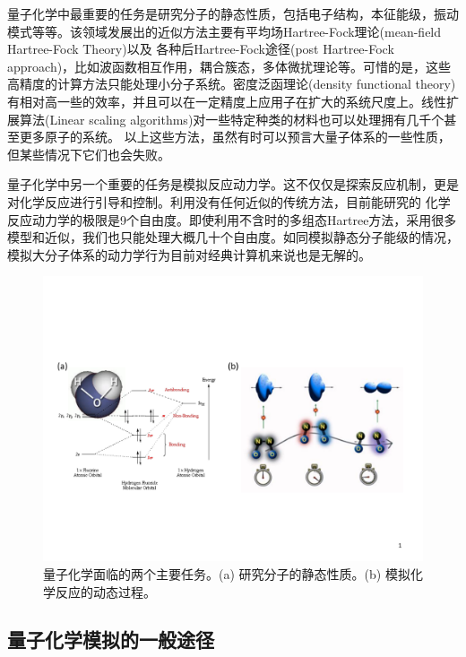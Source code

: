 量子化学中最重要的任务是研究分子的静态性质，包括电子结构，本征能级，振动模式等等\cite{qschem2}。该领域发展出的近似方法主要有平均场Hartree-Fock理论(mean-field Hartree-Fock Theory)以及
各种后Hartree-Fock途径(post Hartree-Fock approach)，比如波函数相互作用，耦合簇态，多体微扰理论等\cite{qschem3}。可惜的是，这些高精度的计算方法只能处理小分子系统。密度泛函理论(density functional theory)\cite{qschem4,qschem5,qschem6}
有相对高一些的效率，并且可以在一定精度上应用子在扩大的系统尺度上。线性扩展算法(Linear scaling algorithms)\cite{qschem7,qschem8}对一些特定种类的材料也可以处理拥有几千个甚至更多原子的系统。
以上这些方法，虽然有时可以预言大量子体系的一些性质，但某些情况下它们也会失败\cite{qschem9,qschem10,qschem11,qschem12}。

量子化学中另一个重要的任务是模拟反应动力学。这不仅仅是探索反应机制，更是对化学反应进行引导和控制\cite{qschem13,qschem14,qschem15,qschem16}。利用没有任何近似的传统方法，目前能研究的
化学反应动力学的极限是9个自由度\cite{qschem17}。即使利用不含时的多组态Hartree方法\cite{qschem18}，采用很多模型和近似，我们也只能处理大概几十个自由度。如同模拟静态分子能级的情况，
模拟大分子体系的动力学行为目前对经典计算机来说也是无解的。

\begin{figure}[htbp]
            \begin{center}
              \includegraphics[width= 0.8\columnwidth]{figures/chemscheme.pdf}
              \caption{量子化学面临的两个主要任务。(a) 研究分子的静态性质。(b) 模拟化学反应的动态过程。 }\label{chemscheme}
            \end{center}
 \end{figure}

\subsection{量子化学模拟的一般途径}

